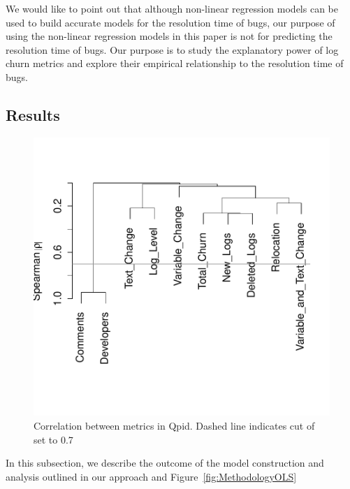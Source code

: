 We would like to point out that although non-linear regression models can be used to build accurate models for the resolution time of bugs, our purpose of using the non-linear regression models in this paper is not for predicting the resolution time of bugs. Our purpose is to study the explanatory power of log churn metrics and explore their empirical relationship to the resolution time of bugs.%



\subsection*{Results}

\begin{figure}[t]
	\centering 
	\begin{minipage}[b]{0.8\columnwidth}
		
		\includegraphics[width=.81\columnwidth]{QpidSpearman}	
	\end{minipage}
	
	\caption{Correlation between metrics in Qpid. Dashed line indicates cut of set to 0.7\label{fig:Correlation}}
\end{figure}

In this subsection, we describe the outcome of the model construction and analysis outlined in our approach and Figure~\ref{fig:MethodologyOLS}

